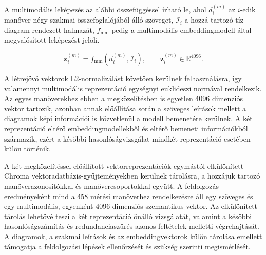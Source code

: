 \documentclass[12pt,a4paper,onehalfspacing, oneside]{book} %
\begin{document}
A multimodális leképezés az alábbi összefüggéssel írható le, ahol $d_i^{(m)}$ az $i$-edik manőver négy szakmai összefoglalójából álló szöveget, $\mathcal{I}_i$ a hozzá tartozó tíz diagram rendezett halmazát, $f_{\mathrm{mm}}$ pedig a multimodális embeddingmodell által megvalósított leképezést jelöli.

\begin{equation}
    \mathbf{z}_i^{(m)} = f_{\mathrm{mm}}\left(d_i^{(m)},\mathcal{I}_i\right), \qquad \mathbf{z}_i^{(m)} \in \mathbb{R}^{4096}.
    \label{eq:multimodal_embedding}
\end{equation}

A létrejövő vektorok L2-normalizálást követően kerülnek felhasználásra, így valamennyi multimodális reprezentáció egységnyi euklideszi normával rendelkezik. Az egyes manőverekhez ebben a megközelítésben is egyetlen 4096 dimenziós vektor tartozik, azonban annak előállítása során a szöveges leírások mellett a diagramok képi információi is közvetlenül a modell bemenetére kerülnek. A két reprezentáció eltérő embeddingmodellekből és eltérő bemeneti információkból származik, ezért a későbbi hasonlóságvizsgálat mindkét reprezentáció esetében külön történik.

A két megközelítéssel előállított vektorreprezentációk egymástól elkülönített Chroma vektoradatbázis-gyűjteményekben kerülnek tárolásra, a hozzájuk tartozó manőverazonosítókkal és manővercsoportokkal együtt. A feldolgozás eredményeként mind a 458 mérési manőverhez rendelkezésre áll egy szöveges és egy multimodális, egyenként 4096 dimenziós szemantikus vektor. Az elkülönített tárolás lehetővé teszi a két reprezentáció önálló vizsgálatát, valamint a későbbi hasonlóságszámítás és redundanciaszűrés azonos feltételek melletti végrehajtását. A diagramok, a szakmai leírások és az embeddingvektorok külön tárolása emellett támogatja a feldolgozási lépések ellenőrzését és szükség szerinti megismétlését.
\end{document}
